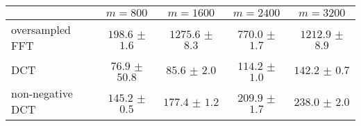 \centering
\renewcommand{\arraystretch}{1.2}
\begin{tabular}{@{}lcccc@{}}
\toprule
 & $m=800$ & $m=1600$ & $m=2400$ & $m=3200$\\
\midrule
oversampled FFT & $198.6$ $\pm$ $1.6$ & $1275.6$ $\pm$ $8.3$ & $770.0$ $\pm$ $1.7$ & $1212.9$ $\pm$ $8.9$ \\
DCT & $76.9$ $\pm$ $50.8$ & $85.6$ $\pm$ $2.0$ & $114.2$ $\pm$ $1.0$ & $142.2$ $\pm$ $0.7$ \\
non-negative DCT & $145.2$ $\pm$ $0.5$ & $177.4$ $\pm$ $1.2$ & $209.9$ $\pm$ $1.7$ & $238.0$ $\pm$ $2.0$ \\
\bottomrule
\end{tabular}
